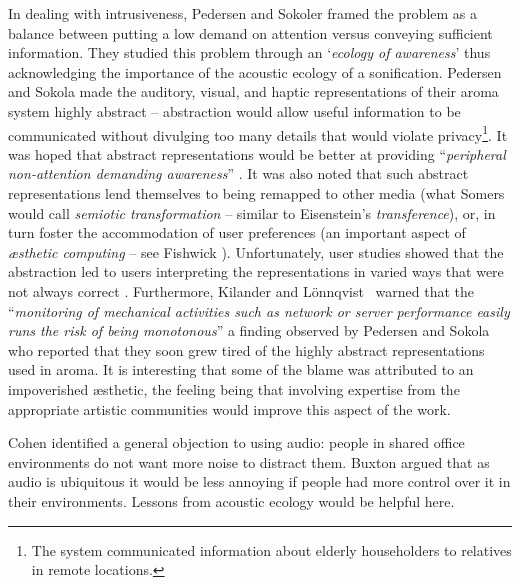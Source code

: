 \documentclass[runningheads]{llncs}
\newcommand{\killonq}{Kilander and L\"{o}nnqvist}
\begin{document}
In dealing with intrusiveness, Pedersen and Sokoler \cite{Pedersen:1997} framed the problem as a balance between putting a low demand on attention versus conveying sufficient information. They studied this problem through an `\emph{ecology of awareness}' thus acknowledging the importance of the acoustic ecology of a sonification. Pedersen and Sokola made the  auditory, visual, and haptic representations of their {\sc aroma} system highly abstract -- abstraction would allow useful information to be communicated without divulging too many details that would violate privacy\footnote{The system communicated information about elderly householders to relatives in remote locations.}. It was hoped that abstract representations would be better at providing ``\emph{peripheral non-attention demanding awareness}'' \cite[p. 53]{Pedersen:1997}. It was also noted that such abstract representations lend themselves to being remapped to other media (what Somers \cite{Somers:1998a} would call \emph{semiotic transformation} -- similar to Eisenstein's \emph{transference}), or, in turn foster the accommodation of user preferences (an important aspect of \emph{{\ae}sthetic computing} -- see Fishwick \cite{Fishwick:2006}). Unfortunately, user studies showed that the abstraction led to users interpreting the representations in varied ways that were not always correct \cite{Pedersen:1998}.  Furthermore, \killonq\  \cite{Kilander:2002} warned that the ``\emph{monitoring of mechanical activities such as network or server performance easily runs the risk of being monotonous}'' a finding observed by Pedersen and Sokola who reported that they soon grew tired of the highly abstract representations used in {\sc aroma}. It is interesting that some of the blame was attributed to an impoverished {\ae}sthetic, the feeling being that involving expertise from the appropriate artistic communities would improve this aspect of the work. 

Cohen \cite{Cohen:1994a} identified a general objection to using audio: people in shared office environments do not want more noise to distract them. Buxton \cite{Buxton:1989} argued that as audio is ubiquitous it would be less annoying if people had more control over it in their environments. Lessons from acoustic ecology would be helpful here.
\end{document}
